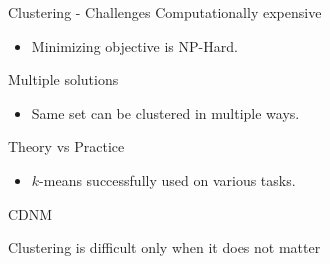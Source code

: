 \documentclass{beamer}
\begin{document}
\begin{frame}{Clustering - Challenges}  
  Computationally expensive\\
  \begin{itemize}
  	\item Minimizing objective is NP-Hard.
  \end{itemize}
  \vspace{0.1in}Multiple solutions
  \begin{itemize}
  	\item Same set can be clustered in multiple ways.
  \end{itemize}
  \vspace{0.1in}Theory vs Practice
  \begin{itemize}
	\item $k$-means successfully used on various tasks.
  \end{itemize}
  
\end{frame}

\begin{frame}{CDNM}
  
  \begin{center}Clustering is difficult only when it does not matter
  \end{center}
\end{frame}
\end{document}
